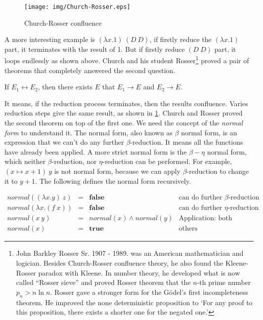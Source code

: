 \documentclass{article}
\begin{document}
\begin{figure}
 \centering
 \texttt{[image: img/Church-Rosser.eps]}
 \caption{Church-Rosser confluence}
 \label{fig:Church-Rosser-confluence}
\end{figure}

A more interesting example is $(\lambda x . 1)\ (D\ D)$, if firstly reduce the $(\lambda x . 1)$ part, it terminates with the result of 1. But if firstly reduce $(D\ D)$ part, it loops endlessly as shown above. Church and his student Rosser\footnote{John Barkley Rosser Sr. 1907 - 1989. was an American mathematician and logician. Besides Church-Rosser confluence theory, he also found the Kleene-Rosser paradox with Kleene. In number theory, he developed what is now called ``Rosser sieve'' and proved Rosser theorem that the $n$-th prime number $p_n > n \ln n$. Rosser gave a stronger form for the  Gödel's first incompleteness theorem. He improved the none deterministic proposition to `For any proof to this proposition, there exists a shorter one for the negated one.'} proved a pair of theorems that completely answered the second question.

\begin{theorem}
If $E_1 \leftrightarrow E_2$, then there exists $E$ that $E_1 \to E$ and $E_2 \to E$.
\end{theorem}

It means, if the reduction process terminates, then the results confluence. Varies reduction steps give the same result, as shown in \ref{fig:Church-Rosser-confluence}. Church and Rosser proved the second theorem on top of the first one. We need the concept of the {\em normal form} to understand it. The normal form, also known as $\beta$ normal form, is an expression that we can't do any further $\beta$-reduction. It means all the functions have already been applied. A more strict normal form is the $\beta-\eta$ normal form, which neither $\beta$-reduction, nor $\eta$-reduction can be performed. For example, $(x \mapsto x + 1)\ y$ is not normal form, because we can apply $\beta$-reduction to change it to $y + 1$. The following defines the normal form recursively.

\[
\begin{array}{rcll}
normal((\lambda x . y)\ z) & = & \textbf{false} & \text{can do further $\beta$-reduction} \\
normal(\lambda x . (f\ x)) & = & \textbf{false} & \text{can do further $\eta$-reduction} \\
normal(x\ y) & = & normal(x) \land normal(y) & \text{Application: both function and parameter are normal forms} \\
normal(x) & = & \textbf{true} & \text{others}
\end{array}
\]
\end{document}
